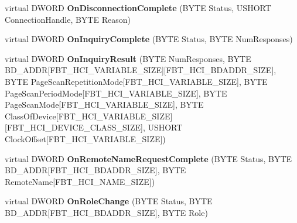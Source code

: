 \begin{DoxyCompactItemize}
\item 
\mbox{\label{class_c_hci_ae5cd1ad7982dc8ebb0dcbf25b7931d53}} 
virtual D\+W\+O\+RD {\bfseries On\+Disconnection\+Complete} (B\+Y\+TE Status, U\+S\+H\+O\+RT Connection\+Handle, B\+Y\+TE Reason)
\item 
\mbox{\label{class_c_hci_afa108374cc401eccbfe662030faee4b7}} 
virtual D\+W\+O\+RD {\bfseries On\+Inquiry\+Complete} (B\+Y\+TE Status, B\+Y\+TE Num\+Responses)
\item 
\mbox{\label{class_c_hci_ad1e52dcf792f8cc2c112504b33ed92e8}} 
virtual D\+W\+O\+RD {\bfseries On\+Inquiry\+Result} (B\+Y\+TE Num\+Responses, B\+Y\+TE B\+D\+\_\+\+A\+D\+DR\mbox{[}F\+B\+T\+\_\+\+H\+C\+I\+\_\+\+V\+A\+R\+I\+A\+B\+L\+E\+\_\+\+S\+I\+ZE\mbox{]}\mbox{[}F\+B\+T\+\_\+\+H\+C\+I\+\_\+\+B\+D\+A\+D\+D\+R\+\_\+\+S\+I\+ZE\mbox{]}, B\+Y\+TE Page\+Scan\+Repetition\+Mode\mbox{[}F\+B\+T\+\_\+\+H\+C\+I\+\_\+\+V\+A\+R\+I\+A\+B\+L\+E\+\_\+\+S\+I\+ZE\mbox{]}, B\+Y\+TE Page\+Scan\+Period\+Mode\mbox{[}F\+B\+T\+\_\+\+H\+C\+I\+\_\+\+V\+A\+R\+I\+A\+B\+L\+E\+\_\+\+S\+I\+ZE\mbox{]}, B\+Y\+TE Page\+Scan\+Mode\mbox{[}F\+B\+T\+\_\+\+H\+C\+I\+\_\+\+V\+A\+R\+I\+A\+B\+L\+E\+\_\+\+S\+I\+ZE\mbox{]}, B\+Y\+TE Class\+Of\+Device\mbox{[}F\+B\+T\+\_\+\+H\+C\+I\+\_\+\+V\+A\+R\+I\+A\+B\+L\+E\+\_\+\+S\+I\+ZE\mbox{]}\mbox{[}F\+B\+T\+\_\+\+H\+C\+I\+\_\+\+D\+E\+V\+I\+C\+E\+\_\+\+C\+L\+A\+S\+S\+\_\+\+S\+I\+ZE\mbox{]}, U\+S\+H\+O\+RT Clock\+Offset\mbox{[}F\+B\+T\+\_\+\+H\+C\+I\+\_\+\+V\+A\+R\+I\+A\+B\+L\+E\+\_\+\+S\+I\+ZE\mbox{]})
\item 
\mbox{\label{class_c_hci_ac34d7b0ddd7aedc0e0b2fc579fd9f355}} 
virtual D\+W\+O\+RD {\bfseries On\+Remote\+Name\+Request\+Complete} (B\+Y\+TE Status, B\+Y\+TE B\+D\+\_\+\+A\+D\+DR\mbox{[}F\+B\+T\+\_\+\+H\+C\+I\+\_\+\+B\+D\+A\+D\+D\+R\+\_\+\+S\+I\+ZE\mbox{]}, B\+Y\+TE Remote\+Name\mbox{[}F\+B\+T\+\_\+\+H\+C\+I\+\_\+\+N\+A\+M\+E\+\_\+\+S\+I\+ZE\mbox{]})
\item 
\mbox{\label{class_c_hci_ad19b7bda76da41c0fc01c01886522d9f}} 
virtual D\+W\+O\+RD {\bfseries On\+Role\+Change} (B\+Y\+TE Status, B\+Y\+TE B\+D\+\_\+\+A\+D\+DR\mbox{[}F\+B\+T\+\_\+\+H\+C\+I\+\_\+\+B\+D\+A\+D\+D\+R\+\_\+\+S\+I\+ZE\mbox{]}, B\+Y\+TE Role)
\item 
\mbox{\label{class_c_hci_a63f66d3f8f50d27cc8adcb5439e5dbe2}} 

\end{DoxyCompactItemize}
